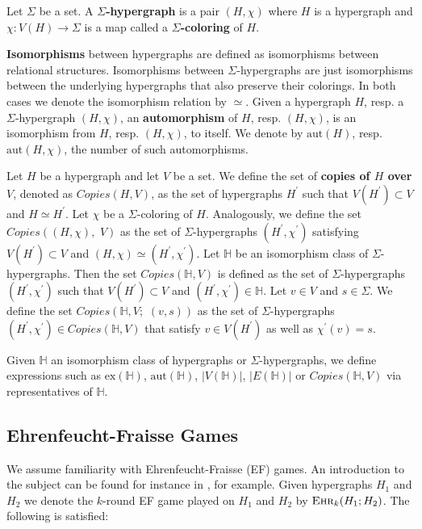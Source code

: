 \documentclass[12pt,notitlepage,a4paper]{article}
\theoremstyle{definition}
\newcommand{\ehr}{\textsc{Ehr}}
\newcommand{\aut}{\mathrm{aut}}
\newcommand{\ex}{\mathrm{ex}}
\begin{document}
Let $\Sigma$ be a set. A \textbf{$\Sigma$-hypergraph}
is a pair $(H, \chi)$ where $H$ is a hypergraph
and $\chi: V(H)\rightarrow \Sigma$ is a map 
called a \textbf{$\Sigma$-coloring} of $H$. \par


\textbf{Isomorphisms} between hypergraphs are defined as 
isomorphisms between relational structures. Isomorphisms between $\Sigma$-hypergraphs are just
isomorphisms between the underlying hypergraphs that also preserve their colorings. 
In both cases we denote the isomorphism relation by $\simeq$. 
Given a hypergraph $H$, resp. a $\Sigma$-hypergraph $(H, \chi)$,
an \textbf{automorphism} of $H$, resp. $(H,\chi)$,
is an isomorphism from $H$, resp. $(H,\chi)$, to itself.
We  denote by $\aut(H)$, resp. $\aut(H,\chi)$,
the number of such automorphisms. \par

Let $H$ be a hypergraph and let $V$ be a set. We define the
set of \textbf{copies of $H$ over $V$}, denoted as $Copies(H,V)$, 
as the set of hypergraphs 
$H^\prime$ such that
$V(H^\prime)\subset V$ and $H\simeq H^\prime$. Let 
$\chi$ be a $\Sigma$-coloring of $H$. 
Analogously, we define the set $Copies\left(
(H,\chi),\, \, V\right)$ as the set of $\Sigma$-hypergraphs
$(H^\prime,\chi^\prime)$ satisfying $V(H^\prime)\subset V$ and
$(H,\chi)\simeq (H^\prime,\chi^\prime)$. Let $\mathbb{H}$ be 
an isomorphism class of $\Sigma$-hypergraphs. Then the set
$Copies(\mathbb{H}, V)$ is defined as the set of $\Sigma$-hypergraphs
$(H^\prime,\chi^\prime)$ such that 
$V(H^\prime)\subset V$ and
$(H^\prime,\chi^\prime)\in \mathbb{H}$. 
Let $v\in V$ and $s\in \Sigma$. We define the
set $Copies\left(\mathbb{H}, V;\,\, (v,s)\right)$ 
as the set of $\Sigma$-hypergraphs
$(H^\prime,\chi^\prime)\in Copies(\mathbb{H}, V)$
that satisfy $v\in V(H^\prime)$ as well as
$\chi^\prime(v)=s$. \par

Given $\mathbb{H}$ an isomorphism class of hypergraphs or $\Sigma$-hypergraphs,
we define expressions
such as $\ex(\mathbb{H})$, $\aut(\mathbb{H})$,
$|V(\mathbb{H})|$, $|E(\mathbb{H})|$ or
$Copies(\mathbb{H},V)$ via representatives of $\mathbb{H}$.\par 




\subsection{Ehrenfeucht-Fraisse Games}

We assume familiarity with Ehrenfeucht-Fraisse (EF) games.
An introduction to the subject can be found for instance in
\cite[Section 2]{finitemodeltheory1}, for example. Given
hypergraphs $H_1$ and $H_2$ we denote the $k$-round EF game played 
on $H_1$ and
$H_2$ by $\ehr_k(H_1;H_2)$.
The following is satisfied:
\end{document}
